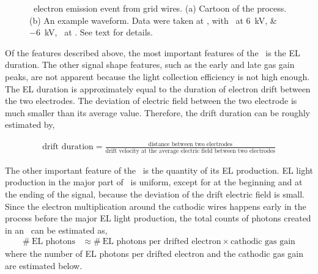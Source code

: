\begin{figure}[!htbp]
\begin{subfigure}[b]{0.8\textwidth}
	\caption{}
	\label{fig:ElectronEmissionPulse c}
\end{subfigure}
	\caption[\gtest\ electron emission event from grid wires]{\gtest\ electron emission event from grid wires. (a) Cartoon of the process. (b) An example waveform. Data were taken at , with \opvtvb\ at \SIlist{+6;-6}{kV}, \opgd\ at \standarddensity . See text for details.}
	\label{fig:ElectronEmissionPulse}
\end{figure}

Of the features described above, the most important features of  the \ees\ is the EL duration. The other signal shape features, such as the early and late gas gain peaks, are not apparent because the light collection efficiency is not high enough. The EL duration is approximately equal to the duration of electron drift between the two electrodes. The deviation of electric field between the two electrode is much smaller than its average value. Therefore, the drift duration can be roughly estimated by, 

\begin{align}
\text{drift duration} = \frac{\text{distance between two electrodes}}{\text{drift velocity at the average electric field between two electrodes} }
\end{align}

The other important feature of the \ees\ is the quantity of its EL production. EL light production in the major part of \ees\ is uniform, except for at the beginning and at the ending of the signal, because the deviation of the drift electric field is small. Since the electron multiplication around the cathodic wires happens early in the process before the major EL light production, the total counts of photons created in an \ees\  can be estimated as,
\begin{align}
\#\ \text{EL photons} & \approx \#\ \text{EL photons per drifted electron} \times \text{cathodic gas gain}
\end{align}
where the number of EL photons per drifted electron and the cathodic gas gain are estimated below.


